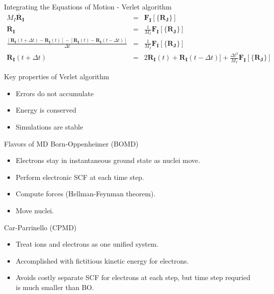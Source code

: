 \documentclass[aspectratio=169]{beamer}
\let \vec \mathbf
\begin{document}
    \begin{frame}{Integrating the Equations of Motion - Verlet algorithm}
        \begin{eqnarray*}
            M_I \ddot{\vec{R_I}} & = &  \vec{F_I}[\{\vec{R_J}\}]\\
            \ddot{\vec{R_I}} & = & \frac{1}{M_I} \vec{F_I}[\{\vec{R_J}\}]\\
            \frac{[\vec{R_I}(t+\Delta t)-\vec{R_I}(t)]-[\vec{R_I}(t)-\vec{R_I}(t-\Delta t)]}{\Delta t} & = & \frac{1}{M_I} \vec{F_I}[\{\vec{R_J}\}]\\
            \vec{R_I}(t+\Delta t) & = & 2\vec{R_I}(t) + \vec{R_I}(t-\Delta t)]+\frac{\Delta t^2}{M_I} \vec{F_I}[\{\vec{R_J}\}]
        \end{eqnarray*}

        Key properties of Verlet algorithm
        \begin{itemize}
            \item Errors do not accumulate
            \item Energy is conserved
            \item Simulations are stable
        \end{itemize}
    \end{frame}

    \begin{frame}{Flavors of MD}
        Born-Oppenheimer (BOMD)
        \begin{itemize}
            \item Electrons stay in instantaneous ground state as nuclei move.
            \item Perform electronic SCF at each time step.
            \item Compute forces (Hellman-Feynman theorem).
            \item Move nuclei.
        \end{itemize}

        Car-Parrinello (CPMD)\cite{carUnifiedApproachMolecular1985}
        \begin{itemize}
            \item Treat ions and electrons as one unified system.
            \item Accomplished with fictitious kinetic energy for electrons.
            \item Avoids costly separate SCF for electrons at each step, but time step requried is much smaller than BO.
        \end{itemize}

    \end{frame}
\end{document}
